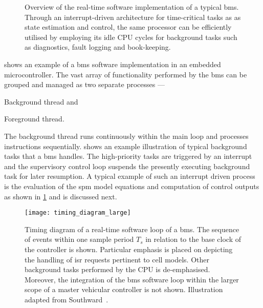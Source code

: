 \begin{figure}[!tbp]
{\begin{subfigure}[t]{\wd\algboxA}
            \usebox{\algboxA}
        \end{subfigure}
        \hfill
        \begin{subfigure}[t]{\wd\algboxB}
            \label{subfig:fgRTprocess}
            \raisebox{\dimexpr.5\ht\algboxA-.5\ht\algboxB}{%
                \usebox{\algboxB}%
            }%
        \end{subfigure}
    }
    \caption[Overview of real-time software implementation of a typical
    ]{Overview of the real-time software implementation of a typical
        \gls{bms}. Through an interrupt-driven architecture for time-critical tasks as
        as state estimation and control, the same processor can be
        efficiently utilised by employing its idle CPU cycles for background
    tasks such as diagnostics, fault logging and book-keeping.}
    \label{fig:basicRTCsoftwarearch}
\end{figure}

  shows  an  example   of  a  \gls{bms}  software
implementation in an  embedded microcontroller. The vast  array of functionality
performed by the \gls{bms} can be  grouped and managed as two separate processes
---
\begin{enumerate*}[label=\itshape\alph*\upshape)]
    \item Background thread and
    \item Foreground thread.
\end{enumerate*}
The   background   thread  runs   continuously   within   the  main   loop   and
processes instructions sequentially.   shows an example
illustration  of  typical  background  tasks   that  a  \gls{bms}  handles.  The
high-priority tasks  are triggered by  an interrupt and the  supervisory control
loop suspends  the presently executing  background task for later  resumption. A
typical example  of such an  interrupt driven process  is the evaluation  of the
\gls{spm}  model  equations and  computation  of  control  outputs as  shown  in
\cref{subfig:fgRTprocess} and is discussed next.

\begin{figure}[!tbp]
    \centering
    \texttt{[image: timing\_diagram\_large]}
    \caption[Timing diagram of a real-time software loop of a ]
    {Timing diagram of a real-time software loop of a \gls{bms}. The sequence of
        events within one sample period $T_s$ in relation to the base clock of
        the controller is shown. Particular emphasis is placed on depicting the
        handling of \gls{isr} requests pertinent to cell models. Other
        background tasks performed by the CPU is de-emphasised. Moreover, the
        integration of the  \gls{bms} software loop within  the larger  scope of
        a master  vehicular controller is not shown. Illustration adapted from
    Southward~\cite{Southward2011}.}
    \label{fig:timingdiagramBig}
\end{figure}

